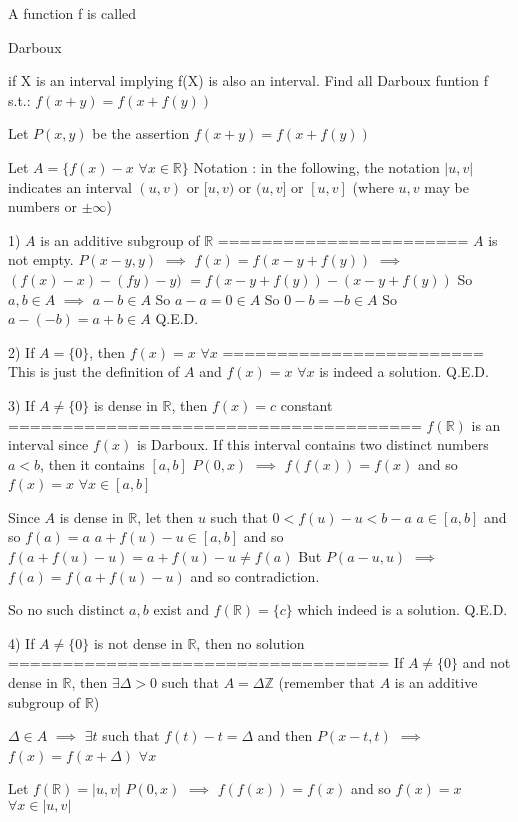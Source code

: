 \begin{solution}
	\begin{tcolorbox}A function f is called \begin{bolded}Darboux\end{bolded} if X is an interval implying f(X) is also an interval.
Find all Darboux funtion f s.t.:
$f(x+y)=f(x+f(y))$\end{tcolorbox}
Let $P(x,y)$ be the assertion $f(x+y)=f(x+f(y))$

Let $A=\{f(x)-x$ $\forall x\in\mathbb R\}$
Notation : in the following, the notation $|u,v|$ indicates an interval $(u,v)$ or $[u,v)$ or $(u,v]$ or $[u,v]$ (where $u,v$ may be numbers or $\pm \infty$)

1) $A$ is an additive subgroup of $\mathbb R$
=======================
$A$ is not empty.
$P(x-y,y)$ $\implies$ $f(x)=f(x-y+f(y))$ $\implies$ $(f(x)-x)-(fy)-y)$ $=f(x-y+f(y))-(x-y+f(y))$
So $a,b\in A$ $\implies$ $a-b\in A$
So $a-a=0\in A$
So $0-b=-b\in A$
So $a-(-b)=a+b\in A$
Q.E.D.

2) If $A=\{0\}$, then $f(x)=x$ $\forall x$
========================
This is just the definition of $A$ and $f(x)=x$ $\forall x$ is indeed a solution.
Q.E.D.

3) If $A\ne \{0\}$ is dense in $\mathbb R$, then $f(x)=c$ constant
======================================
$f(\mathbb R)$ is an interval since $f(x)$ is Darboux.
If this interval contains two distinct numbers $a<b$, then it contains $[a,b]$
$P(0,x)$ $\implies$ $f(f(x))=f(x)$ and so $f(x)=x$ $\forall x\in[a,b]$

Since $A$ is dense in $\mathbb R$, let then $u$ such that $0<f(u)-u<b-a$
$a\in[a,b]$ and so $f(a)=a$
$a+f(u)-u\in[a,b]$ and so $f(a+f(u)-u)=a+f(u)-u\ne f(a)$
But $P(a-u,u)$ $\implies$ $f(a)=f(a+f(u)-u)$ and so contradiction.

So no such distinct $a,b$ exist and $f(\mathbb R)=\{c\}$ which indeed is a solution.
Q.E.D.

4) If $A\ne\{0\}$ is not dense in $\mathbb R$, then no solution
===================================
If $A\ne \{0\}$ and not dense in $\mathbb R$, then $\exists \Delta>0$ such that $A=\Delta\mathbb Z$ (remember that $A$ is an additive subgroup of $\mathbb R$)

$\Delta\in A$ $\implies$ $\exists t$ such that $f(t)-t=\Delta$ and then $P(x-t,t)$ $\implies$ $f(x)=f(x+\Delta)$ $\forall x$

Let $f(\mathbb R)=|u,v|$
$P(0,x)$ $\implies$ $f(f(x))=f(x)$ and so $f(x)=x$ $\forall x\in|u,v|$


\end{solution}
